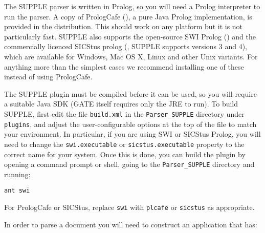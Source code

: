 
The SUPPLE parser is written in Prolog, so you will need a Prolog interpreter
to run the parser.  A copy of PrologCafe
(), a pure Java
Prolog implementation, is provided in the distribution.  This should work on
any platform but it is not particularly fast.  SUPPLE also supports the
open-source SWI Prolog () and the
commercially licenced SICStus prolog
(, SUPPLE supports versions 3 and 4),
which are available for Windows, Mac OS X, Linux and other Unix variants.  For
anything more than the simplest cases we recommend installing one of these
instead of using PrologCafe.


The SUPPLE plugin must be compiled before it can be used, so you will require a
suitable Java SDK (GATE itself requires only the JRE to run). To build SUPPLE,
first edit the file {\tt build.xml} in the {\tt Parser\_SUPPLE} directory under
{\tt plugins}, and adjust the user-configurable options at the top of the file to
match your environment.  In particular, if you are using SWI or SICStus Prolog,
you will need to change the {\tt swi.executable} or {\tt sicstus.executable}
property to the correct name for your system. Once this is done, you can build
the plugin by opening a command prompt or shell, going to the {\tt Parser\_SUPPLE}
directory and running:
\begin{small}\begin{verbatim}
ant swi
\end{verbatim}\end{small}
For PrologCafe or SICStus, replace {\tt swi} with {\tt plcafe} or {\tt sicstus} as
appropriate.


In order to parse a document you will need to construct an application that has:

